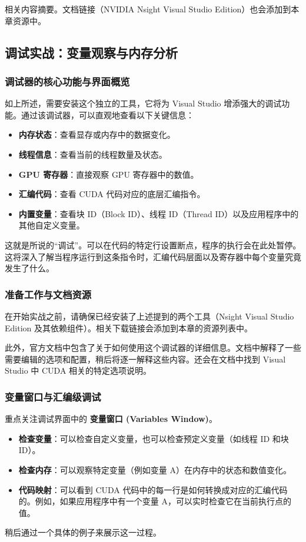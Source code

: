 相关内容摘要。文档链接（NVIDIA Nsight Visual Studio Edition）也会添加到本章资源中。

\subsection{调试实战：变量观察与内存分析}

\subsubsection{调试器的核心功能与界面概览}
如上所述，需要安装这个独立的工具，它将为 Visual Studio 增添强大的调试功能。通过该调试器，可以直观地查看以下关键信息：
\begin{itemize}
    \item \textbf{内存状态}：查看显存或内存中的数据变化。
    \item \textbf{线程信息}：查看当前的线程数量及状态。
    \item \textbf{GPU 寄存器}：直接观察 GPU 寄存器中的数值。
    \item \textbf{汇编代码}：查看 CUDA 代码对应的底层汇编指令。
    \item \textbf{内置变量}：查看块 ID（Block ID）、线程 ID（Thread ID）以及应用程序中的其他自定义变量。
\end{itemize}

这就是所说的“调试”。可以在代码的特定行设置断点，程序的执行会在此处暂停。这将深入了解当程序运行到这条指令时，汇编代码层面以及寄存器中每个变量究竟发生了什么。

\subsubsection{准备工作与文档资源}
在开始实战之前，请确保已经安装了上述提到的两个工具（Nsight Visual Studio Edition 及其依赖组件）。相关下载链接会添加到本章的资源列表中。

此外，官方文档中包含了关于如何使用这个调试器的详细信息。文档中解释了一些需要编辑的选项和配置，稍后将逐一解释这些内容。还会在文档中找到 Visual Studio 中 CUDA 相关的特定选项说明。

\subsubsection{变量窗口与汇编级调试}
重点关注调试界面中的 \textbf{变量窗口 (Variables Window)}。
\begin{itemize}
    \item \textbf{检查变量}：可以检查自定义变量，也可以检查预定义变量（如线程 ID 和块 ID）。
    \item \textbf{检查内存}：可以观察特定变量（例如变量 A）在内存中的状态和数值变化。
    \item \textbf{代码映射}：可以看到 CUDA 代码中的每一行是如何转换成对应的汇编代码的。例如，如果应用程序中有一个变量 A，可以实时检查它在当前执行点的值。
\end{itemize}
稍后通过一个具体的例子来展示这一过程。

